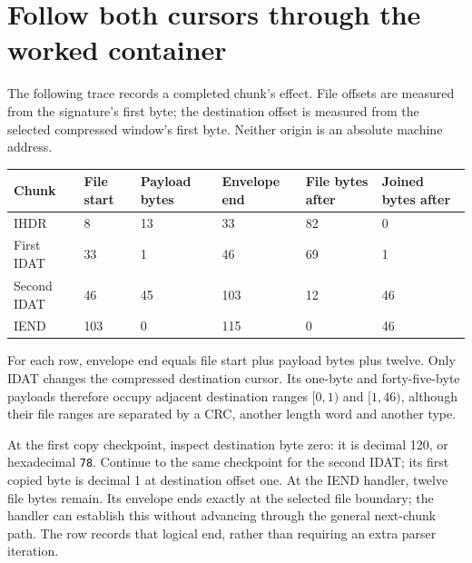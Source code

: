 \section{Follow both cursors through the worked container}
The following trace records a completed chunk's effect. File offsets are measured
from the signature's first byte; the destination offset is measured from the selected
compressed window's first byte. Neither origin is an absolute machine address.

\begin{longtable}{p{20mm}p{19mm}p{22mm}p{24mm}p{26mm}p{30mm}}
\toprule Chunk & File start & Payload bytes & Envelope end & File bytes after & Joined bytes after \\\midrule
IHDR & 8 & 13 & 33 & 82 & 0 \\
First IDAT & 33 & 1 & 46 & 69 & 1 \\
Second IDAT & 46 & 45 & 103 & 12 & 46 \\
IEND & 103 & 0 & 115 & 0 & 46 \\\bottomrule
\end{longtable}
For each row, envelope end equals file start plus payload bytes plus twelve. Only
IDAT changes the compressed destination cursor. Its one-byte and forty-five-byte
payloads therefore occupy adjacent destination ranges $[0,1)$ and $[1,46)$, although
their file ranges are separated by a CRC, another length word and another type.

At the first copy checkpoint, inspect destination byte zero: it is decimal 120,
or hexadecimal \texttt{78}. Continue to the same checkpoint for the second IDAT;
its first copied byte is decimal 1 at destination offset one. At the IEND handler,
twelve file bytes remain. Its envelope ends exactly at the selected file boundary;
the handler can establish this without advancing through the general next-chunk path.
The row records that logical end, rather than requiring an extra parser iteration.
